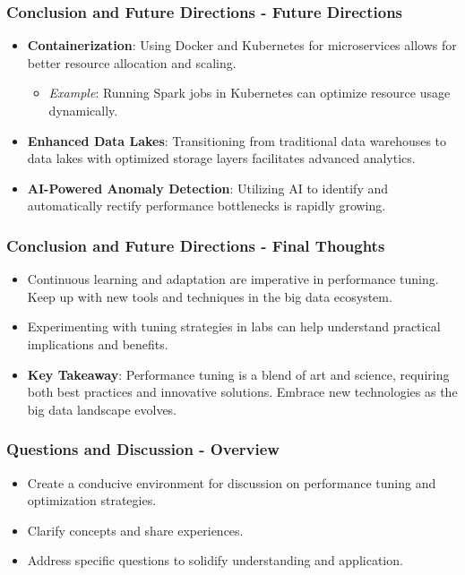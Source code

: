 \documentclass[aspectratio=169]{beamer}
\begin{document}
\begin{frame}[fragile]
    \frametitle{Conclusion and Future Directions - Future Directions}
    \begin{itemize}
        \item \textbf{Containerization}: Using Docker and Kubernetes for microservices allows for better resource allocation and scaling.
        \begin{itemize}
            \item \textit{Example}: Running Spark jobs in Kubernetes can optimize resource usage dynamically.
        \end{itemize}
        
        \item \textbf{Enhanced Data Lakes}: Transitioning from traditional data warehouses to data lakes with optimized storage layers facilitates advanced analytics.
        
        \item \textbf{AI-Powered Anomaly Detection}: Utilizing AI to identify and automatically rectify performance bottlenecks is rapidly growing.
    \end{itemize}
\end{frame}

\begin{frame}[fragile]
    \frametitle{Conclusion and Future Directions - Final Thoughts}
    \begin{itemize}
        \item Continuous learning and adaptation are imperative in performance tuning. Keep up with new tools and techniques in the big data ecosystem.
        
        \item Experimenting with tuning strategies in labs can help understand practical implications and benefits.
        
        \item \textbf{Key Takeaway}: Performance tuning is a blend of art and science, requiring both best practices and innovative solutions. Embrace new technologies as the big data landscape evolves.
    \end{itemize}
\end{frame}

\begin{frame}[fragile]
    \frametitle{Questions and Discussion - Overview}
    \begin{itemize}
        \item Create a conducive environment for discussion on performance tuning and optimization strategies.
        \item Clarify concepts and share experiences.
        \item Address specific questions to solidify understanding and application.
    \end{itemize}
\end{frame}
\end{document}
